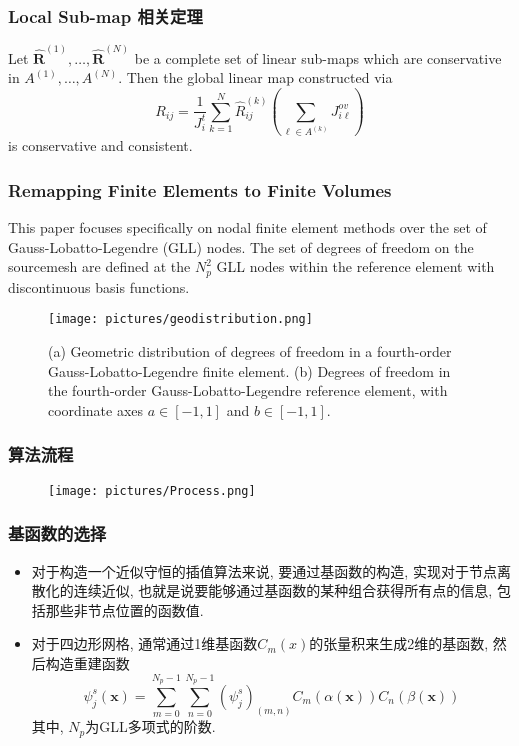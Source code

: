 \documentclass[unknownkeysallowed]{beamer}
\newcommand{\vb}{\mathbf}
\begin{document}
\begin{spacing}{1.2}
\begin{frame}
\end{frame}

\begin{frame}
\frametitle{Local Sub-map 相关定理}
\begin{theorem}[通过局部的插值算子构造整体插值算子]
  Let $\hat{\mathbf{R}}^{(1)}, \ldots, \hat{\mathbf{R}}^{(N)}$ be a complete set of linear sub-maps which are conservative in $A^{(1)}, \ldots, A^{(N)}$.  Then the global linear map constructed via $$
R_{ij} = \frac{1}{J^t_i} \sum_{k=1}^{N} \hat{R}^{(k)}_{ij} \left( \sum_{\ell \in A^{(k)}} J^{ov}_{i\ell} \right)
$$ is conservative and consistent.

\end{theorem}
\end{frame}

\begin{frame}
\frametitle{Remapping Finite Elements to Finite Volumes}
This paper focuses specifically on nodal finite element methods over the set of Gauss-Lobatto-Legendre (GLL) nodes. The set of degrees of freedom on the sourcemesh are defined at the $N_p^2$ GLL nodes within the reference element with discontinuous basis functions.
\begin{figure}[c]
\texttt{[image: pictures/geodistribution.png]}

\tiny{(a) Geometric distribution of degrees of freedom in a fourth-order Gauss-Lobatto-Legendre finite element. (b) Degrees of freedom in the fourth-order Gauss-Lobatto-Legendre reference element, with coordinate axes $a\in[-1,1]$ and $b\in [-1,1].$}
\end{figure}


\end{frame}

\begin{frame}
\frametitle{算法流程}
\begin{figure}[c]
\texttt{[image: pictures/Process.png]}
\end{figure}
\end{frame}

\begin{frame}
\frametitle{基函数的选择}
\begin{itemize}
\item 对于构造一个近似守恒的插值算法来说, 要通过基函数的构造, 实现对于节点离散化的连续近似, 也就是说要能够通过基函数的某种组合获得所有点的信息, 包括那些非节点位置的函数值.
\pause
\item 对于四边形网格, 通常通过1维基函数$C_m(x)$的张量积来生成2维的基函数, 然后构造重建函数
$$\psi_j^s(\vb{x})=\displaystyle{\sum_{m=0}^{N_p-1}\sum_{n=0}^{N_p-1}}(\psi_j^s)_{(m,n)}C_m(\alpha(\vb{x}))C_n(\beta(\vb{x}))$$
其中, $N_p$为GLL多项式的阶数.
\end{itemize}
\end{frame}




\end{spacing}
\end{document}
